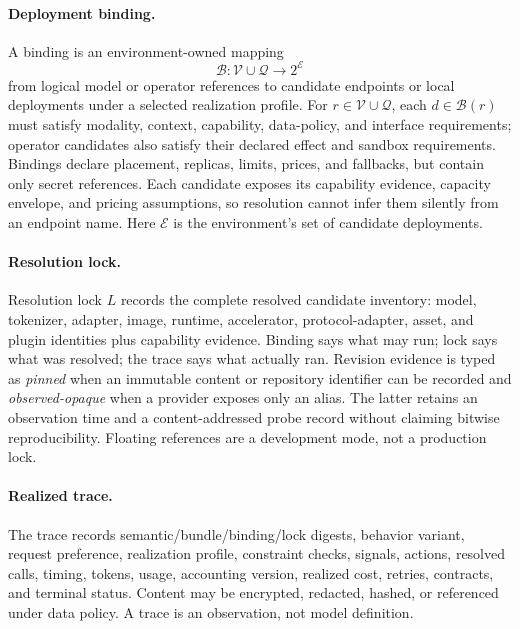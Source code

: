 \paragraph{Deployment binding.}
A binding is an environment-owned mapping
\begin{equation}
 \mathcal{B}:\mathcal{V}\cup\mathcal{Q}\rightarrow 2^{\mathcal{E}}
 \end{equation}
from logical model or operator references to candidate endpoints or local
deployments under a selected realization profile. For
$r\in\mathcal{V}\cup\mathcal{Q}$, each
$d\in \mathcal{B}(r)$ must
satisfy modality, context, capability, data-policy, and interface requirements;
operator candidates also satisfy their declared effect and sandbox
requirements. Bindings declare placement, replicas, limits, prices, and
fallbacks, but contain only secret references. Each candidate exposes its
capability evidence, capacity envelope, and pricing assumptions, so resolution
cannot infer them silently from an endpoint name. Here $\mathcal{E}$ is the
environment's set of candidate deployments.

\paragraph{Resolution lock.}
Resolution lock $L$ records the complete resolved candidate inventory: model,
tokenizer, adapter, image, runtime, accelerator, protocol-adapter, asset, and
plugin identities plus capability evidence. Binding says what may run; lock says
what was resolved; the trace says what actually ran. Revision evidence is typed
as \emph{pinned} when an immutable content or repository identifier can be
recorded and \emph{observed-opaque} when a provider exposes only an alias. The
latter retains an observation time and a content-addressed probe record without
claiming bitwise reproducibility. Floating references are a development mode,
not a production lock.

\paragraph{Realized trace.}
The trace records semantic/bundle/binding/lock digests, behavior variant,
request preference, realization profile, constraint
checks, signals, actions, resolved calls, timing, tokens, usage, accounting
version, realized cost, retries, contracts, and terminal status. Content may be
encrypted, redacted, hashed, or referenced under data policy. A trace is an
observation, not model definition.

